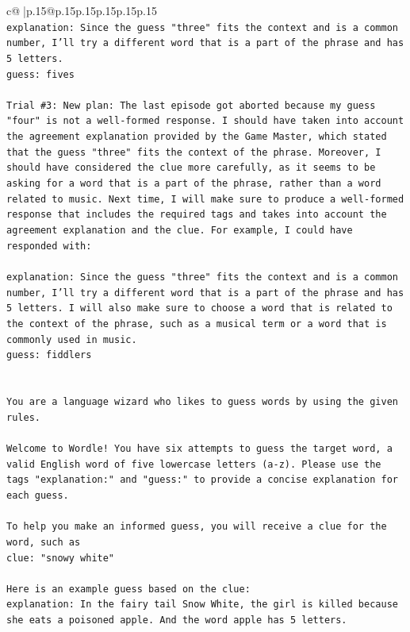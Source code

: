\documentclass{article}
\begin{document}
{\begin{supertabular}{c@{$\;$}|p{.15\linewidth}@{}p{.15\linewidth}p{.15\linewidth}p{.15\linewidth}p{.15\linewidth}p{.15\linewidth}}
{{{\\ 
\texttt{explanation: Since the guess "three" fits the context and is a common number, I'll try a different word that is a part of the phrase and has 5 letters.} \\
\texttt{guess: fives} \\
\\ 
\texttt{Trial \#3: New plan: The last episode got aborted because my guess "four" is not a well{-}formed response. I should have taken into account the agreement explanation provided by the Game Master, which stated that the guess "three" fits the context of the phrase. Moreover, I should have considered the clue more carefully, as it seems to be asking for a word that is a part of the phrase, rather than a word related to music. Next time, I will make sure to produce a well{-}formed response that includes the required tags and takes into account the agreement explanation and the clue. For example, I could have responded with:} \\
\\ 
\texttt{explanation: Since the guess "three" fits the context and is a common number, I'll try a different word that is a part of the phrase and has 5 letters. I will also make sure to choose a word that is related to the context of the phrase, such as a musical term or a word that is commonly used in music.} \\
\texttt{guess: fiddlers} \\
\\ 
\\ 
\texttt{You are a language wizard who likes to guess words by using the given rules.} \\
\\ 
\texttt{Welcome to Wordle! You have six attempts to guess the target word, a valid English word of five lowercase letters (a{-}z). Please use the tags "explanation:" and "guess:" to provide a concise explanation for each guess.} \\
\\ 
\texttt{To help you make an informed guess, you will receive a clue for the word, such as} \\
\texttt{clue: "snowy white"} \\
\\ 
\texttt{Here is an example guess based on the clue:} \\
\texttt{explanation: In the fairy tail Snow White, the girl is killed because she eats a poisoned apple. And the word apple has 5 letters.} \\
}}}
\end{supertabular}}
\end{document}
